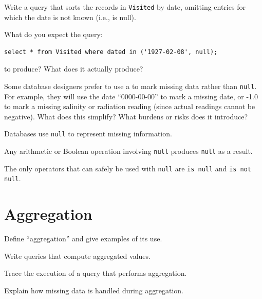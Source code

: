 \documentclass{book}
\begin{document}
\begin{challenge}
  Write a query that sorts the records in \texttt{Visited} by date,
  omitting entries for which the date is not known (i.e., is null).
\end{challenge}

\begin{challenge}
  What do you expect the query:

\begin{verbatim}
select * from Visited where dated in ('1927-02-08', null);
\end{verbatim}

  to produce? What does it actually produce?
\end{challenge}

\begin{challenge}
  Some database designers prefer to use a
   to mark missing data
  rather than \texttt{null}. For example, they will use the date
  ``0000-00-00'' to mark a missing date, or -1.0 to mark a missing
  salinity or radiation reading (since actual readings cannot be
  negative). What does this simplify? What burdens or risks does it
  introduce?
\end{challenge}

\begin{keypoints}
\begin{swcitemize}
\item
  Databases use \texttt{null} to represent missing information.
\item
  Any arithmetic or Boolean operation involving \texttt{null} produces
  \texttt{null} as a result.
\item
  The only operators that can safely be used with \texttt{null} are
  \texttt{is null} and \texttt{is not null}.
\end{swcitemize}
\end{keypoints}

\section{Aggregation}

\begin{objectives}
\begin{swcitemize}
\item
  Define ``aggregation'' and give examples of its use.
\item
  Write queries that compute aggregated values.
\item
  Trace the execution of a query that performs aggregation.
\item
  Explain how missing data is handled during aggregation.
\end{swcitemize}
\end{objectives}
\end{document}
